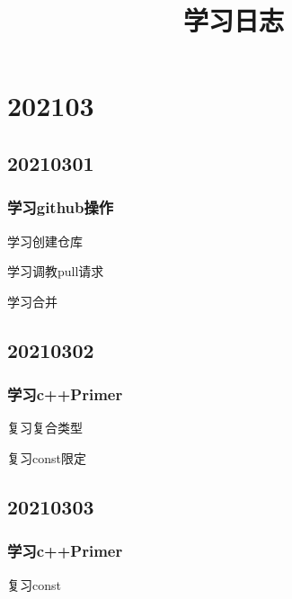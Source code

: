 \documentclass{article} %
\begin{document}

\begin{titlepage}           %
\title{学习日志} %
\maketitle                  %
\end{titlepage}
\tableofcontents        %
\newpage                %

\section{202103}      %
\subsection{20210301}
\subsubsection{学习github操作}
    学习创建仓库\par
    学习调教pull请求\par
    学习合并\par
\subsection{20210302}
\subsubsection{学习c++Primer}
    复习复合类型\par
    复习const限定\par
\subsection{20210303}
\subsubsection{学习c++Primer}
    复习const\par
\end{document}
